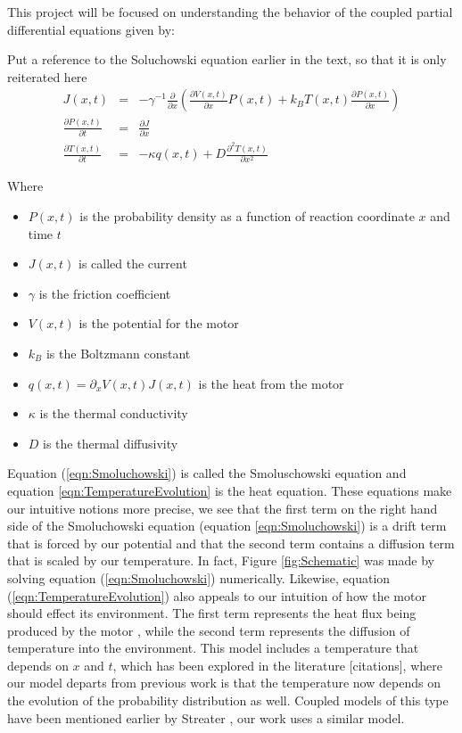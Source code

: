 This project will be focused on understanding the behavior of the coupled partial differential equations given by:

{\color{red} Put a reference to the Soluchowski equation earlier in the text, so that it is only reiterated here}
\begin{eqnarray}
J(x, t) &=& -\gamma^{-1} \frac{\partial}{\partial x} \left ( \frac{\partial V(x, t)}{\partial x} P(x, t) + k_B T(x, t) \frac{\partial P(x, t)}{\partial x} \right )  \\
\frac{\partial P(x, t)}{\partial t} &=& \frac{\partial J}{\partial x} \label{eqn:Smoluchowski} \\
\frac{\partial T(x, t)}{\partial t} &=& -\kappa q(x, t) + D \frac{\partial^2 T(x, t)}{\partial x^2} \label{eqn:TemperatureEvolution}
\end{eqnarray}

Where
\begin{itemize}
\item{$P(x, t)$ is the probability density as a function of  reaction coordinate $x$ and time $t$}
\item{$J(x, t)$ is called the current}
\item{$\gamma$ is the friction coefficient}
\item{$V(x, t)$ is the potential for the motor}
\item{$k_B$ is the Boltzmann constant}
\item{$q(x, t) = \partial_x V(x, t) J(x, t)$ is the heat from the motor}
\item{$\kappa$ is the thermal conductivity}
\item{$D$ is the thermal diffusivity}
\end{itemize}

Equation (\ref{eqn:Smoluchowski}) is called the Smoluschowski equation \cite{KellerBustamante2000} and equation \ref{eqn:TemperatureEvolution} is the heat equation. These equations make our intuitive notions more precise, we see that the first term on the right hand side of the Smoluchowski equation (equation \ref{eqn:Smoluchowski}) is a drift term that is forced by our potential and that the second term contains a diffusion term that is scaled by our temperature. In fact, Figure \ref{fig:Schematic} was made by solving equation (\ref{eqn:Smoluchowski}) numerically. Likewise, equation (\ref{eqn:TemperatureEvolution}) also appeals to our intuition of how the motor should effect its environment. The first term represents the heat flux being produced by the motor \cite{M.W.Jack2016}, while the second term represents the diffusion of temperature into the environment. This model includes a temperature that depends on $x$ and $t$, which has been explored in the literature {\color{red} [citations]}, where our model departs from previous work is that the temperature now depends on the evolution of the probability distribution as well. Coupled models of this type have been mentioned earlier by Streater \cite{Streater1997, Streater1997a}, our work uses a similar model.

